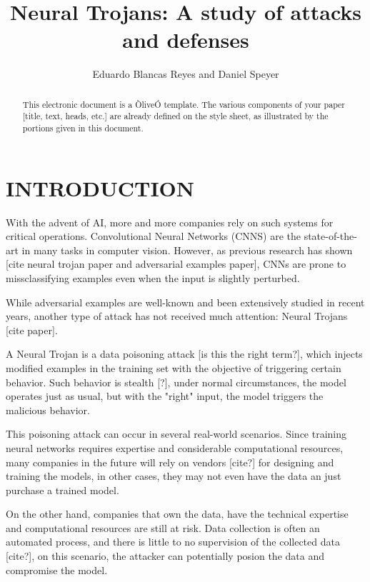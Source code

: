 \documentclass[letterpaper, 10 pt, conference]{ieeeconf}  %
\title{\LARGE \bf
Neural Trojans: A study of attacks and defenses
}
\author{Eduardo Blancas Reyes and Daniel Speyer%
}
\begin{document}
\maketitle
\thispagestyle{empty}
\pagestyle{empty}


\begin{abstract}

This electronic document is a ÒliveÓ template. The various components of your paper [title, text, heads, etc.] are already defined on the style sheet, as illustrated by the portions given in this document.

\end{abstract}


\section{INTRODUCTION}

With the advent of AI, more and more companies rely on such systems for critical operations. Convolutional Neural Networks (CNNS) are the state-of-the-art in many tasks in computer vision. However, as previous research has shown [cite neural trojan paper and adversarial examples paper], CNNs are prone to missclassifying examples even when the input is slightly perturbed.

While adversarial examples are well-known and been extensively studied in recent years, another type of attack has not received much attention: Neural Trojans [cite paper].

A Neural Trojan is a data poisoning attack [is this the right term?], which injects modified examples in the training set with the objective of triggering certain behavior. Such behavior is stealth [?], under normal circumstances, the model operates just as usual, but with the "right" input, the model triggers the malicious behavior.

This poisoning attack can occur in several real-world scenarios. Since training neural networks requires expertise and considerable computational resources, many companies in the future will rely on vendors [cite?] for designing and training the models, in other cases, they may not even have the data an just purchase a trained model.

On the other hand, companies that own the data, have the technical expertise and computational resources are still at risk. Data collection is often an automated process, and there is little to no supervision of the collected data [cite?], on this scenario, the attacker can potentially posion the data and compromise the model.
\end{document}
